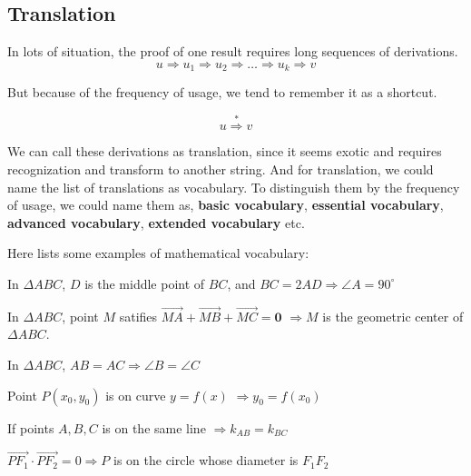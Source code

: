 \subsection{Translation}

In lots of situation, the proof of one result requires long sequences of derivations.
\[
  u \Rightarrow u_1 \Rightarrow u_2 \Rightarrow \dots \Rightarrow u_k \Rightarrow v
\]

But because of the frequency of usage, we tend to remember it as a shortcut.

\[ u \overset{*}{\Rightarrow} v\]

We can call these derivations as translation, since it seems exotic and requires recognization and transform to another string. And for translation, we could name the list of translations as vocabulary. To distinguish them by the frequency of usage, we could name them as, \textbf{basic vocabulary}, \textbf{essential vocabulary}, \textbf{advanced vocabulary}, \textbf{extended vocabulary} etc.

Here lists some examples of mathematical vocabulary: 

\begin{example}
  In $\Delta ABC$, $D$ is the middle point of $BC$, and $BC=2AD \Rightarrow \angle A = 90^\circ$
\end{example}

\begin{example}
  In $\Delta ABC$, point $M$ satifies $\overrightarrow{MA} + \overrightarrow{MB} + \overrightarrow{MC} =\mathbf{0}$  $\Rightarrow M$  is the geometric center of $\Delta ABC$.
\end{example}

\begin{example}
  In $\Delta ABC$, $AB=AC \Rightarrow \angle B = \angle C$
\end{example}

\begin{example}
  Point $P (x_0, y_0)$ is on curve $y = f(x)$ $\Rightarrow y_0 = f(x_0)$
\end{example}

\begin{example}
  If points $A, B, C$ is on the same line $\Rightarrow k_{AB} = k_{BC}$
\end{example}

\begin{example}
  $\overrightarrow{PF_1} \cdot \overrightarrow{PF_2} = 0 \Rightarrow P$ is on the circle whose diameter is $F_1 F_2$
\end{example}

